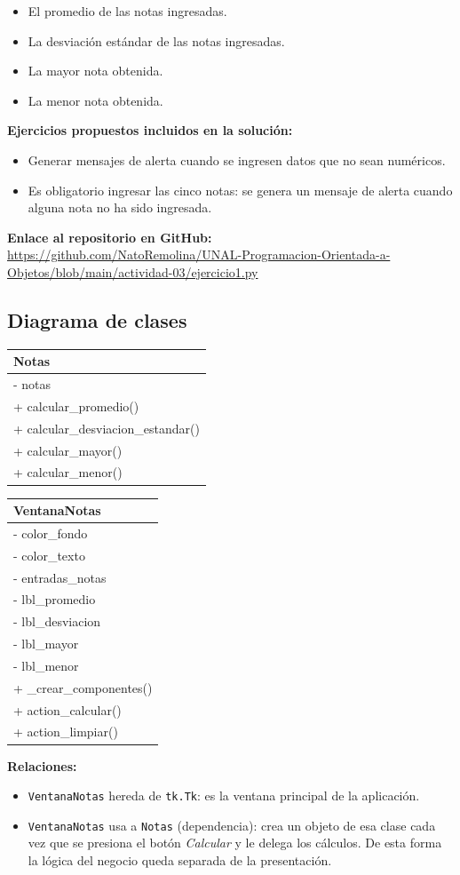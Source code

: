 \documentclass[11pt, a4paper]{article}
\newcommand{\clasebox}[3]{%
\begin{center}
\begin{tabular}{|l|}
\hline
\textbf{#1} \\
\hline
#2
\hline
#3
\hline
\end{tabular}
\end{center}
}
\begin{document}
\begin{itemize}
    \item El promedio de las notas ingresadas.
    \item La desviación estándar de las notas ingresadas.
    \item La mayor nota obtenida.
    \item La menor nota obtenida.
\end{itemize}

\noindent \textbf{Ejercicios propuestos incluidos en la solución:}
\begin{itemize}
    \item Generar mensajes de alerta cuando se ingresen datos que no sean numéricos.
    \item Es obligatorio ingresar las cinco notas: se genera un mensaje de alerta cuando
          alguna nota no ha sido ingresada.
\end{itemize}

\noindent \textbf{Enlace al repositorio en GitHub:} \\
\url{https://github.com/NatoRemolina/UNAL-Programacion-Orientada-a-Objetos/blob/main/actividad-03/ejercicio1.py}

\subsection{Diagrama de clases}
\clasebox{Notas}
{%
- notas \\
}
{%
+ calcular\_promedio() \\
+ calcular\_desviacion\_estandar() \\
+ calcular\_mayor() \\
+ calcular\_menor() \\
}

\clasebox{VentanaNotas}
{%
- color\_fondo \\
- color\_texto \\
- entradas\_notas \\
- lbl\_promedio \\
- lbl\_desviacion \\
- lbl\_mayor \\
- lbl\_menor \\
}
{%
+ \_crear\_componentes() \\
+ action\_calcular() \\
+ action\_limpiar() \\
}

\noindent \textbf{Relaciones:}
\begin{itemize}
    \item \texttt{VentanaNotas} hereda de \texttt{tk.Tk}: es la ventana principal de la aplicación.
    \item \texttt{VentanaNotas} usa a \texttt{Notas} (dependencia): crea un objeto de esa clase cada
          vez que se presiona el botón \textit{Calcular} y le delega los cálculos. De esta forma la
          lógica del negocio queda separada de la presentación.
\end{itemize}
\end{document}

